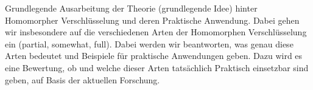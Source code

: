 \label{sec:ziel}
    Grundlegende Ausarbeitung der Theorie (grundlegende Idee) hinter Homomorpher Verschlüsselung und deren Praktische Anwendung. Dabei gehen wir insbesondere auf die verschiedenen Arten der Homomorphen Verschlüsselung ein (partial, somewhat, full). Dabei werden wir beantworten, was genau diese Arten bedeutet und Beispiele für praktische Anwendungen geben. Dazu wird es eine Bewertung, ob und welche dieser Arten tatsächlich Praktisch einsetzbar sind geben, auf Basis der aktuellen Forschung.
